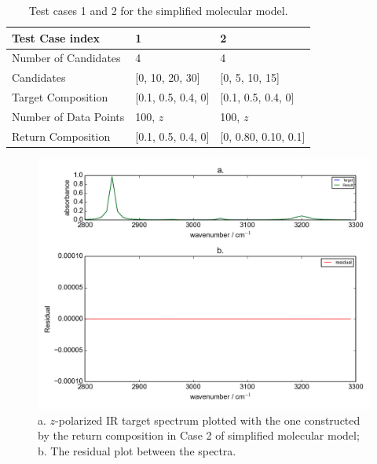 \begin{table} 
\begin{center}
{\def\arraystretch{1.5}
\begin{tabular}{| l | l | l | }
\hline
Test Case index & 1 & 2  \\
\hline
Number of Candidates & 4 & 4  \\
\hline
Candidates & [0, 10, 20, 30] & [0, 5, 10, 15] \\
\hline
Target Composition & [0.1, 0.5, 0.4, 0] & [0.1, 0.5, 0.4, 0]     \\
\hline
Number of Data Points & 100, $z$ &  100, $z$     \\
\hline
Return Composition & [0.1, 0.5, 0.4, 0] & [0, 0.80, 0.10, 0.1] \\
\hline
\end{tabular} 
}
\end{center}
\caption{Test cases 1 and 2 for the simplified molecular model.}
\label{tab:3.1}
\end{table}	

\begin{figure}[!ht] 
\includegraphics[scale=0.7]{Figures/toy_model_result_plotting_ir_cos_4candi_1.png}
\caption{a. $z$-polarized IR target spectrum plotted with the one constructed by the return composition in Case 2 of simplified molecular model; b. The residual plot between the spectra.}
\label{fig:3.2}
\end{figure}

